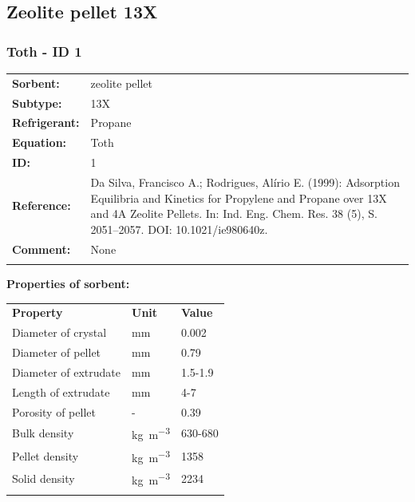 \subsection{Zeolite pellet 13X}
%
\subsubsection{Toth - ID 1}
%
\begin{tabular}[l]{|lp{11.5cm}|}
\hline
\addlinespace

\textbf{Sorbent:} & zeolite pellet \\
\textbf{Subtype:} & 13X \\
\textbf{Refrigerant:} & Propane \\
\textbf{Equation:} & Toth \\
\textbf{ID:} & 1 \\
\textbf{Reference:} & Da Silva, Francisco A.; Rodrigues, Alírio E. (1999): Adsorption Equilibria and Kinetics for Propylene and Propane over 13X and 4A Zeolite Pellets. In: Ind. Eng. Chem. Res. 38 (5), S. 2051–2057. DOI: 10.1021/ie980640z. \\
\textbf{Comment:} & None \\

\addlinespace
\hline
\end{tabular}
\newline

\textbf{Properties of sorbent:}
\newline
%
\begin{longtable}[l]{lll}
\toprule
\addlinespace
\textbf{Property} & \textbf{Unit} & \textbf{Value} \\
\addlinespace
\midrule
\endhead
\bottomrule
\endfoot
\bottomrule
\endlastfoot
\addlinespace

Diameter of crystal & \si{\milli\meter} & 0.002\\
Diameter of pellet & \si{\milli\meter} & 0.79\\
Diameter of extrudate & \si{\milli\meter} & 1.5-1.9\\
Length of extrudate & \si{\milli\meter} & 4-7\\
Porosity of pellet & - & 0.39\\
Bulk density & \si{\kilogram\per\cubic\meter} & 630-680\\
Pellet density & \si{\kilogram\per\cubic\meter} & 1358\\
Solid density & \si{\kilogram\per\cubic\meter} & 2234\\

\addlinespace\end{longtable}

